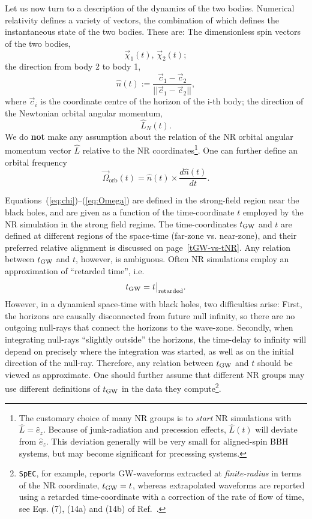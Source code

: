 \documentclass[11pt,tightenlines,article,amssymb,amsmath,amsfonts,superscriptaddress,nofootinbib]{revtex4}
\newcommand{\EzNR}{\hat e_z}
\newcommand{\nNR}{\hat{n}}
\newcommand{\lNR}{\hat L}
\newcommand{\tGW}{t_{\rm GW}}
\begin{document}
Let us now turn to a description of the dynamics of the two bodies.
Numerical relativity defines a variety of vectors, the combination of
which defines the instantaneous state of the two bodies.  These are:
The dimensionless spin vectors of the two bodies,
\begin{equation}\label{eq:chi}
  \vec\chi_1(t),\, \vec\chi_2(t);
\end{equation}
the direction from body 2 to body 1,
\begin{equation}
\label{eq:nhat}
  \nNR(t) := \frac{\vec{c}_1 - \vec{c}_2}{|| \vec{c}_1 - \vec{c}_2 ||},
\end{equation}
where $\vec{c}_i$ is the coordinate centre of the horizon of the i-th body;
the direction of the Newtonian orbital angular momentum,
\begin{equation}
  \hat L_N(t).
\end{equation}
We do {\bf not} make any assumption about the relation of the
NR orbital angular momentum vector $\lNR$ relative to the NR
coordinates\footnote{The customary choice of many NR groups is to
  \emph{start} NR simulations with $\lNR=\EzNR$.  Because of
  junk-radiation and precession effects, $\lNR(t)$ will deviate from
  $\EzNR$.  This deviation generally will be very small for
  aligned-spin BBH systems, but may become significant for precessing
  systems.}.
One can further define an orbital frequency
\begin{equation}\label{eq:Omega}
  \vec\Omega_\mathrm{orb}(t) = \nNR(t) \times \frac{d\nNR(t)}{dt}.
\end{equation}

Equations~(\ref{eq:chi})--(\ref{eq:Omega}) are defined in the
strong-field region near the black holes, and are given as a function
of the time-coordinate $t$ employed by the NR simulation in the strong
field regime. 
The time-coordinates $\tGW$ and $t$ are defined at different regions
of the space-time (far-zone vs. near-zone), and their preferred relative
alignment is discussed on page~\ref{tGW-vs-tNR}. Any relation between $\tGW$ and
$t$, however, is ambiguous.  Often NR simulations employ an approximation of
``retarded time'', i.e.
\begin{equation}
  \label{eq:tretarted}
  \tGW = t\big|_{\rm retarded}.
\end{equation}
However, in a dynamical space-time with black holes, two difficulties
arise: First, the horizons are causally disconnected from future null
infinity, so there are no outgoing null-rays that connect the horizons
to the wave-zone.  Secondly, when integrating null-rays ``slightly
outside'' the horizons, the time-delay to infinity will depend on
precisely where the integration was started, as well as on the initial
direction of the null-ray.  Therefore, any relation between $\tGW$ and
$t$ should be viewed as approximate. One should further assume that
different NR groups may use different definitions of $\tGW$ in the
data they compute\footnote{{\tt SpEC}, for example, reports GW-waveforms
extracted at \emph{finite-radius} in terms of the NR coordinate,
$\tGW=t$, whereas extrapolated waveforms are reported using a retarded
time-coordinate with a correction of the rate of flow of time, see
Eqs. (7), (14a) and (14b) of Ref.~\cite{Boyle:2009vi}.}.
\end{document}
